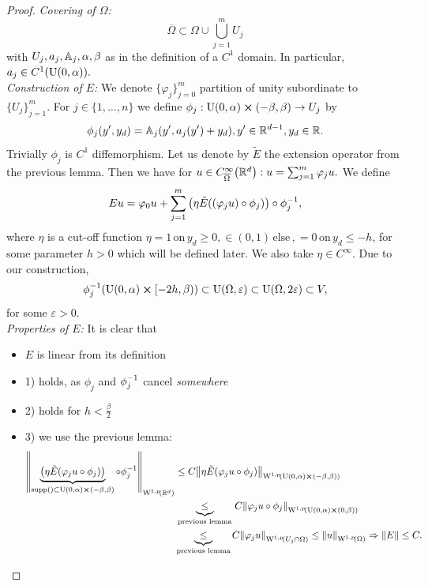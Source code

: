 \documentclass{article}
\begin{document}
\begin{proof}
	\textit{Covering of $\Omega$:}
	\[
		\overline{\Omega} \subset \Omega \cup \bigcup_{j=1}^m U_j
	\]
	with $U_j,a_j, \mathbb{A}_j, \alpha, \beta$ as in the definition of a $C^1$ domain. In particular, $a_j \in C^1\qty(\text{U}(0,\alpha)).$
	\\
	\textit{Construction of $E$:}
	We denote $\{\varphi_j \}_{j=0}^m$ partition of unity subordinate to $\{U_j\}_{j=1}^m.$ For $j \in \{1, \dots, n\}$ we define $\phi_j : \text{U}(0,\alpha) \cross (-\beta,\beta) \to U_j$ by
	\[
		\phi_j\qty(y',y_d) = \mathbb{A}_j (y', a_j(y') + y_d), y' \in {\mathbb R}^{d-1}, y_d \in {\mathbb R}.
	\]
	Trivially $\phi_j$ is $C^1$ diffemorphism. Let us denote by $\tilde{E}$ the extension operator from the previous lemma. Then we have for $u \in C^{\infty}_{\overline{\Omega}}\qty({\mathbb R}^d): u = \sum_{j=1}^m \varphi_j u.$ We define
	\[
		Eu=\varphi_0 u + \sum_{j=1}^m \qty(\eta \tilde{E}\qty((\varphi_j u) \circ \phi_j)) \circ \phi_j^{-1},
	\]
	where $\eta$ is a cut-off function $\eta = 1 \, \text{on} \, y_d \geq 0, \in (0,1) \, \text{else} \,, =0 \, \text{on} \, y_d \leq -h$, for some parameter $h>0$ which will be defined later. We also take $\eta \in C^\infty$. Due to our construction,
	\[
		\phi_j^{-1} \qty(\text{U}(0,\alpha) \cross [-2h, \beta)) \subset \text{U}(\Omega,\varepsilon) \subset \text{U}(\Omega,2 \varepsilon) \subset V,  
	\]
	for some $\varepsilon>0.$
	\\
	\textit{Properties of $E$:}
	It is clear that
	\begin{itemize}
		\item $E$ is linear from its definition
		\item 1) holds, as $\phi_j$ and $\phi_j^{-1}$ cancel \textit{somewhere}
		\item 2) holds for $h<\frac{\beta}{2}$ 
		\item 3) we use the previous lemma:
			\begin{align*}
				\norm{\underbrace{\qty(\eta \tilde{E}\qty(\varphi_j u \circ \phi_j))}_{\supp () \subset \text{U}(0,\alpha) \cross (-\beta, \beta)} \circ \inverse{\phi_j}}_{\WkpSet[1][p]{\R^d}} & \leq C \norm{\eta \tilde{E}\qty(\varphi_j u \circ \phi_j)}_{\WkpSet[1][p]{\text{U}(0,\alpha) \cross (-\beta, \beta)}} \\ &\underbrace{\leq}_{\, \text{previous lemma} \,} C \norm{\varphi_j u \circ \phi_j}_{\WkpSet[1][p]{\text{U}(0,\alpha) \cross (0,\beta)}}\\ &\underbrace{\leq}_{\text{previous lemma}} C \norm{\varphi_j u}_{\WkpSet[1][p]{U_j \cap \Omega}} \leq \norm{u}_{\WkpSet[1][p]{\Omega}} \Rightarrow \norm{E} \leq C.

\end{align*}
\end{itemize}
\end{proof}
\end{document}
